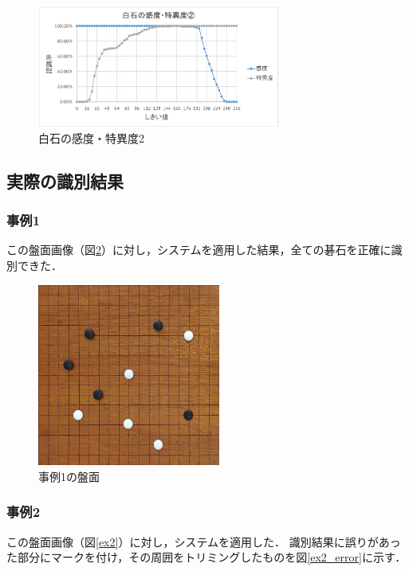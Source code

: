\documentclass[openright]{nitocs}
\numberwithin{equation}{section}
\begin{document}
            \begin{figure}[tb] %
                \begin{center}
                \includegraphics[width=80mm,height=40mm]{Case2_White_TPF_TNF.eps} 
                \caption{白石の感度・特異度2}
                \label{Case2White}
                \end{center}
            \end{figure}

        \subsection{実際の識別結果} %
            \subsubsection{事例1}
                この盤面画像（図\ref{ex1}）に対し，システムを適用した結果，全ての碁石を正確に識別できた．
                \begin{figure}[tb] %
                    \begin{center}
                    \includegraphics[width=60mm,height=60mm]{DSC_0041/boardImg.jpg} 
                    \caption{事例1の盤面}
                    \label{ex1}
                    \end{center}
                \end{figure}

            \subsubsection{事例2} %
                この盤面画像（図\ref{ex2}）に対し，システムを適用した．
                識別結果に誤りがあった部分にマークを付け，その周囲をトリミングしたものを図\ref{ex2_error}に示す．
\end{document}
